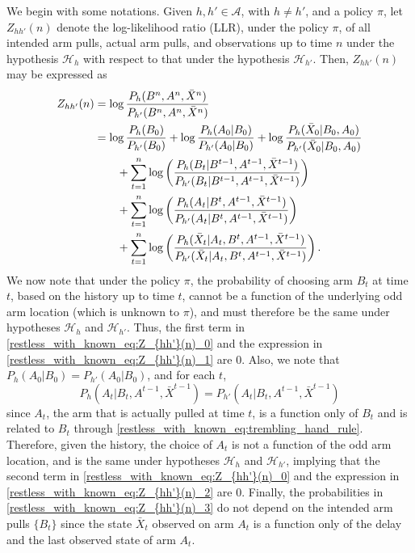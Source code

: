 We begin with some notations. Given $h,h'\in\mathcal{A}$, with $h\neq h'$, and a policy $\pi$, let $Z_{hh'}(n)$ denote the log-likelihood ratio (LLR), under the policy $\pi$, of all intended arm pulls, actual arm pulls, and observations up to time $n$ under the hypothesis $\mathcal{H}_h$ with respect to that under the hypothesis $\mathcal{H}_{h'}$. Then, $Z_{hh'}(n)$ may be expressed as
\begin{align}
	Z_{hh'}(n)&=\log\frac{P_h(B^n,A^n,\bar{X}^n)}{P_{h'}(B^n,A^n,\bar{X}^n)}\nonumber\\
    &=\log\frac{P_h(B_0)}{P_{h'}(B_0)}+\log\frac{P_h(A_0|B_0)}{P_{h'}(A_0|B_0)}+\log\frac{P_h(\bar{X}_0|B_0,A_0)}{P_{h'}(\bar{X}_0|B_0,A_0)}\label{restless_with_known_eq:Z_{hh'}(n)_0}\\
    &\quad \quad+\sum\limits_{t=1}^{n}\log\left(\frac{P_h(B_t|B^{t-1},A^{t-1},\bar{X}^{t-1})}{P_{h'}(B_t|B^{t-1},A^{t-1},\bar{X}^{t-1})}\right)\label{restless_with_known_eq:Z_{hh'}(n)_1}\\
    &\quad \quad+\sum\limits_{t=1}^{n}\log\left(\frac{P_h(A_t|B^{t},A^{t-1},\bar{X}^{t-1})}{P_{h'}(A_t|B^{t},A^{t-1},\bar{X}^{t-1})}\right)\label{restless_with_known_eq:Z_{hh'}(n)_2}\\ &\quad \quad+\sum\limits_{t=1}^{n}\log\left(\frac{P_h(\bar{X}_t|A_t,B^{t},A^{t-1},\bar{X}^{t-1})}{P_{h'}(\bar{X}_t|A_t,B^{t},A^{t-1},\bar{X}^{t-1})}\right)\label{restless_with_known_eq:Z_{hh'}(n)_3}.
\end{align}
We now note that under the policy $\pi$, the probability of choosing arm $B_t$ at time $t$, based on the history up to time $t$, cannot be a function of the underlying odd arm location (which is unknown to $\pi$), and must therefore be the same under hypotheses $\mathcal{H}_h$ and $\mathcal{H}_{h'}$. Thus, the first term in \eqref{restless_with_known_eq:Z_{hh'}(n)_0} and the expression in \eqref{restless_with_known_eq:Z_{hh'}(n)_1} are $0$. Also, we note that $P_h(A_0|B_0)=P_{h'}(A_0|B_0)$, and for each $t$, $$P_h(A_t|B_t,A^{t-1},\bar{X}^{t-1})=P_{h'}(A_t|B_t,A^{t-1},\bar{X}^{t-1})$$ since $A_t$, the arm that is actually pulled at time $t$, is a function only of $B_t$ and is related to $B_t$ through \eqref{restless_with_known_eq:trembling_hand_rule}. Therefore, given the history, the choice of $A_t$ is not a function of the odd arm location, and is the same under hypotheses $\mathcal{H}_h$ and $\mathcal{H}_{h'}$, implying that the second term in \eqref{restless_with_known_eq:Z_{hh'}(n)_0} and the expression in \eqref{restless_with_known_eq:Z_{hh'}(n)_2} are $0$. Finally, the probabilities in \eqref{restless_with_known_eq:Z_{hh'}(n)_3} do not depend on the intended arm pulls $\{B_t\}$ since the state $\bar{X}_t$ observed on arm $A_t$ is a function only of the delay and the last observed state of arm $A_t$.
